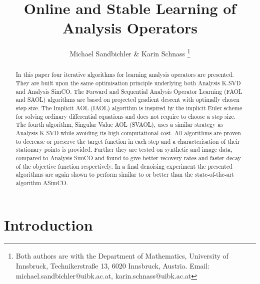 \documentclass[11pt, onecolumn, journal,compsoc]{IEEEtran}
\title{Online and Stable Learning of Analysis Operators}
\author{Michael Sandbichler \& Karin Schnass
\thanks{Both authors are with the Department of Mathematics, University of Innsbruck, Technikerstra\ss e 13, 6020 Innsbruck, Austria. Email: michael.sandbichler@uibk.ac.at, karin.schnass@uibk.ac.at}
}
\theoremstyle{plain}
\theoremstyle{remark}
\begin{document}
\maketitle

\begin{abstract}
In this paper four iterative algorithms for learning analysis operators are presented. They are built upon the same optimisation principle underlying both Analysis K-SVD and Analysis SimCO. 
The Forward and Sequential Analysis Operator Learning (FAOL and SAOL) algorithms are based on projected gradient descent with optimally chosen step size. The Implicit AOL (IAOL) algorithm is inspired by the implicit Euler scheme for solving ordinary differential equations and does not require to choose a step size. The fourth algorithm, Singular Value AOL (SVAOL), uses a similar strategy as Analysis K-SVD while avoiding its high computational cost. All algorithms are proven to decrease or preserve the target function in each step and a characterisation of their stationary points is provided. Further they are tested on synthetic and image data, compared to Analysis SimCO and found to give better recovery rates and faster decay of the objective function respectively. In a final denoising experiment the presented algorithms are again shown to perform similar to or better than the state-of-the-art algorithm ASimCO. 
\end{abstract}

%
\section{Introduction}\label{sec:intro}
\end{document}
